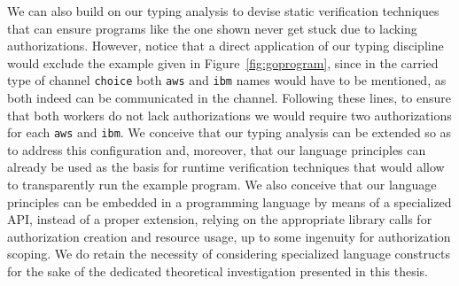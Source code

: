 We can also build on our typing analysis to devise static verification techniques that can ensure programs like the one shown never get stuck due to lacking authorizations. 
However, notice that a direct application of our typing discipline would exclude the example given in Figure~\ref{fig:goprogram}, since in the carried type of channel \lstinline{choice} both \lstinline{aws} and \lstinline{ibm} names would have to be mentioned, as both indeed can be communicated in the channel. Following these lines, to ensure that both workers do not lack authorizations we would require
two authorizations for each \lstinline{aws} and \lstinline{ibm}. We conceive that our typing analysis can be extended so as to address this configuration
and, moreover, that our language principles can already be used as the basis for runtime verification techniques that would allow to transparently run the example program.
We also conceive that our language principles can be embedded in a programming language by means of a specialized API, instead of a proper extension, relying on the 
appropriate library calls for authorization creation and resource usage, up to some ingenuity for authorization scoping. We do retain the necessity of considering specialized
language constructs for the sake of the dedicated theoretical investigation presented in this thesis.

